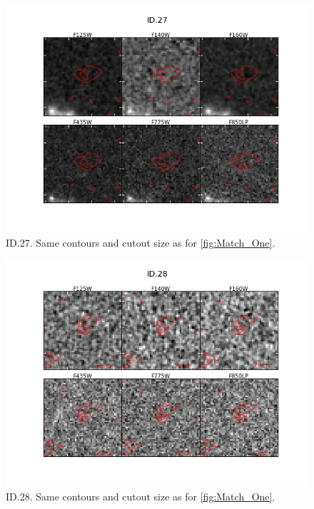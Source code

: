 \begin{figure}[tbp]
\centering \includegraphics[width=160mm]{Matched/ASPECS_Cutout_26.png}
\caption{ID.27. Same contours and cutout size as for \ref{fig:Match_One}.}
\label{fig:Match_Three}
\end{figure}

\begin{figure}[tbp]
\centering \includegraphics[width=160mm]{Matched/ASPECS_Cutout_27.png}
\caption{ID.28. Same contours and cutout size as for \ref{fig:Match_One}.}
\label{fig:Match_Three}
\end{figure}

